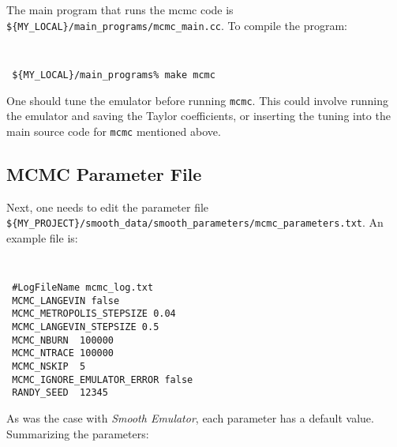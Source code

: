 \documentclass[UserManual.tex]{subfiles}
\begin{document}
The main program that runs the mcmc code is {\tt\$\{MY\_LOCAL\}/main\_programs/mcmc\_main.cc}. To compile the program:
{\tt
\begin{verbatim}
 ${MY_LOCAL}/main_programs% make mcmc
\end{verbatim}}

One should tune the emulator before running {\tt mcmc}. This could involve running the emulator and saving the Taylor coefficients, or inserting the tuning into the main source code for {\tt mcmc} mentioned above.

\subsection{MCMC Parameter File}

Next, one needs to edit the parameter file {\tt\$\{MY\_PROJECT\}/smooth\_data/smooth\_parameters/mcmc\_parameters.txt}. An example file is:
{\tt
\begin{verbatim}
 #LogFileName mcmc_log.txt
 MCMC_LANGEVIN false
 MCMC_METROPOLIS_STEPSIZE 0.04
 MCMC_LANGEVIN_STEPSIZE 0.5
 MCMC_NBURN  100000
 MCMC_NTRACE 100000
 MCMC_NSKIP  5
 MCMC_IGNORE_EMULATOR_ERROR false
 RANDY_SEED  12345
\end{verbatim}}
As was the case with {\it Smooth Emulator}, each parameter has a default value. Summarizing the parameters:
\end{document}
